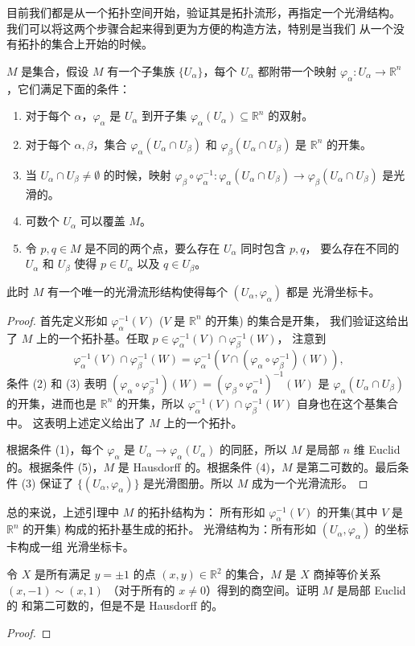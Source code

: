 目前我们都是从一个拓扑空间开始，验证其是拓扑流形，再指定一个光滑结构。
我们可以将这两个步骤合起来得到更为方便的构造方法，特别是当我们
从一个没有拓扑的集合上开始的时候。

\begin{lemma}[光滑流形坐标卡引理]\label{lemma:smooth manifold chart}
  $M$ 是集合，假设 $M$ 有一个子集族 $\{U_\alpha\}$，每个 $U_\alpha$ 都附带一个映射
  $\varphi_\alpha:U_\alpha\to\mathbb{R}^n$，它们满足下面的条件：
  \begin{enumerate}
    \item 对于每个 $\alpha$，$\varphi_\alpha$ 是 $U_\alpha$ 到开子集
    $\varphi_\alpha(U_\alpha)\subseteq\mathbb{R}^n$ 的双射。
    \item 对于每个 $\alpha,\beta$，集合 $\varphi_\alpha(U_\alpha\cap U_\beta)$
    和 $\varphi_\beta(U_\alpha\cap U_\beta)$ 是 $\mathbb{R}^n$ 的开集。
    \item 当 $U_\alpha\cap U_\beta\neq\emptyset$ 的时候，映射
    $\varphi_\beta\circ\varphi_\alpha^{-1}:\varphi_\alpha(U_\alpha\cap U_\beta)\to\varphi_\beta(U_\alpha\cap U_\beta)$
    是光滑的。
    \item 可数个 $U_\alpha$ 可以覆盖 $M$。
    \item 令 $p,q\in M$ 是不同的两个点，要么存在 $U_\alpha$ 同时包含 $p,q$，
    要么存在不同的 $U_\alpha$ 和 $U_\beta$ 使得 $p\in U_\alpha$ 以及 $q\in U_\beta$。
  \end{enumerate}
  此时 $M$ 有一个唯一的光滑流形结构使得每个 $(U_\alpha,\varphi_\alpha)$ 都是
  光滑坐标卡。
\end{lemma}
\begin{proof}
  首先定义形如 $\varphi_\alpha^{-1}(V)$ ($V$ 是 $\mathbb{R}^n$ 的开集) 的集合是开集，
  我们验证这给出了 $M$ 上的一个拓扑基。任取 $p\in\varphi_\alpha^{-1}(V)\cap \varphi_\beta^{-1}(W)$，
  注意到
  \[
    \varphi_\alpha^{-1}(V)\cap \varphi_\beta^{-1}(W)=\varphi_\alpha^{-1}
    \left(V\cap (\varphi_\alpha\circ\varphi_\beta^{-1})(W)\right),
  \]
  条件 (2) 和 (3) 表明 $(\varphi_\alpha\circ\varphi_\beta^{-1})(W)=(\varphi_\beta\circ\varphi_\alpha^{-1})^{-1}(W)$ 是 $\varphi_\alpha(U_\alpha\cap U_\beta)$
  的开集，进而也是 $\mathbb{R}^n$ 的开集，所以 
  $\varphi_\alpha^{-1}(V)\cap \varphi_\beta^{-1}(W)$ 自身也在这个基集合中。
  这表明上述定义给出了 $M$ 上的一个拓扑。

  根据条件 (1)，每个 $\varphi_\alpha$ 是 $U_\alpha\to\varphi_\alpha(U_\alpha)$
  的同胚，所以 $M$ 是局部 $n$ 维 Euclid 的。根据条件 (5)，$M$ 是
  Hausdorff 的。根据条件 (4)，$M$ 是第二可数的。最后条件 (3) 保证了
  $\{(U_\alpha,\varphi_\alpha)\}$ 是光滑图册。所以 $M$ 成为一个光滑流形。
\end{proof}
\begin{remark}
  总的来说，上述引理中 $M$ 的拓扑结构为：
  所有形如 $\varphi_\alpha^{-1}(V)$ 的开集(其中 $V$ 是 $\mathbb{R}^n$ 的开集)
  构成的拓扑基生成的拓扑。
  光滑结构为：所有形如 $(U_\alpha,\varphi_\alpha)$ 的坐标卡构成一组
  光滑坐标卡。
\end{remark}

\begin{problem}{}{}
  令 $X$ 是所有满足 $y=\pm 1$ 的点 $(x,y)\in \mathbb{R}^2$
  的集合，$M$ 是 $X$ 商掉等价关系 $(x,-1)\sim (x,1)$
  （对于所有的 $x\neq 0$）得到的商空间。证明 $M$ 是局部 Euclid 的
  和第二可数的，但是不是 Hausdorff 的。
\end{problem}
\begin{proof}
  
\end{proof}

